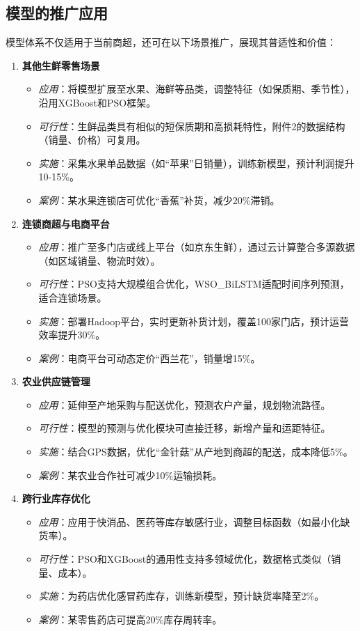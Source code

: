 \documentclass{cumcmthesis} %
\begin{document}
\subsection{模型的推广应用}

模型体系不仅适用于当前商超，还可在以下场景推广，展现其普适性和价值：

\begin{enumerate}
\item \textbf{其他生鲜零售场景}
\begin{itemize}
\item \textit{应用}：将模型扩展至水果、海鲜等品类，调整特征（如保质期、季节性），沿用XGBoost和PSO框架。
\item \textit{可行性}：生鲜品类具有相似的短保质期和高损耗特性，附件2的数据结构（销量、价格）可复用。
\item \textit{实施}：采集水果单品数据（如“苹果”日销量），训练新模型，预计利润提升10-15\%。
\item \textit{案例}：某水果连锁店可优化“香蕉”补货，减少20\%滞销。
\end{itemize}

\item \textbf{连锁商超与电商平台}
\begin{itemize}
\item \textit{应用}：推广至多门店或线上平台（如京东生鲜），通过云计算整合多源数据（如区域销量、物流时效）。
\item \textit{可行性}：PSO支持大规模组合优化，WSO\_BiLSTM适配时间序列预测，适合连锁场景。
\item \textit{实施}：部署Hadoop平台，实时更新补货计划，覆盖100家门店，预计运营效率提升30\%。
\item \textit{案例}：电商平台可动态定价“西兰花”，销量增15\%。
\end{itemize}

\item \textbf{农业供应链管理}
\begin{itemize}
\item \textit{应用}：延伸至产地采购与配送优化，预测农户产量，规划物流路径。
\item \textit{可行性}：模型的预测与优化模块可直接迁移，新增产量和运距特征。
\item \textit{实施}：结合GPS数据，优化“金针菇”从产地到商超的配送，成本降低5\%。
\item \textit{案例}：某农业合作社可减少10\%运输损耗。
\end{itemize}

\item \textbf{跨行业库存优化}
\begin{itemize}
\item \textit{应用}：应用于快消品、医药等库存敏感行业，调整目标函数（如最小化缺货率）。
\item \textit{可行性}：PSO和XGBoost的通用性支持多领域优化，数据格式类似（销量、成本）。
\item \textit{实施}：为药店优化感冒药库存，训练新模型，预计缺货率降至2\%。
\item \textit{案例}：某零售药店可提高20\%库存周转率。
\end{itemize}
\end{enumerate}
\end{document}
